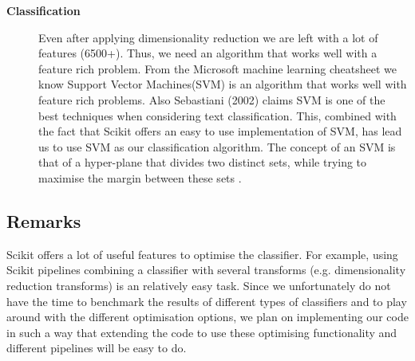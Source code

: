 \begin{description}
\item[\textbf{Classification}]
Even after applying dimensionality reduction we are left with a lot of features (6500+). Thus, we need an algorithm that works well with a feature rich problem. From the Microsoft machine learning cheatsheet\cite{MLCheatSheet} we know Support Vector Machines(SVM) is an algorithm that works well with feature rich problems. Also Sebastiani (2002)\cite{ml_text} claims SVM is one of the best techniques when considering text classification. This, combined with the fact that Scikit offers an easy to use implementation of SVM, has lead us to use SVM as our classification algorithm. The concept of an SVM is that of a hyper-plane that divides two distinct sets, while trying to maximise the margin between these sets \cite{tong2001support}.
\end{description}

\subsection{Remarks}
Scikit offers a lot of useful features to optimise the classifier. For example, using Scikit pipelines combining a classifier with several transforms (e.g. dimensionality reduction transforms) is an relatively easy task. Since we unfortunately do not have the time to benchmark the results of different types of classifiers and to play around with the different optimisation options, we plan on implementing our code in such a way that extending the code to use these optimising functionality and different pipelines will be easy to do.
